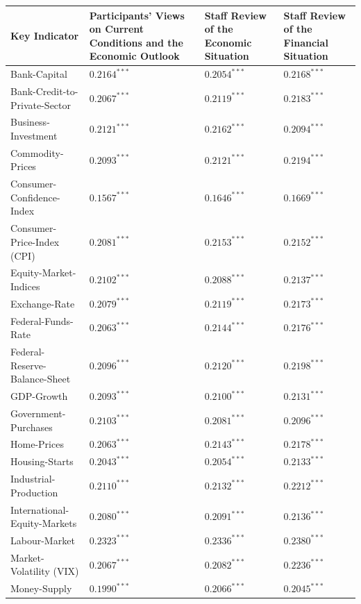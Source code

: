 \begin{table}[htbp]
\centering
\scriptsize
\begin{threeparttable}
\begin{tabular}{p{3.6cm} p{4.3cm} p{3.1cm} p{3.1cm}}
\toprule
\textbf{Key Indicator} &
\textbf{Participants’ Views on Current Conditions and the Economic Outlook} &
\textbf{Staff Review of the Economic Situation} &
\textbf{Staff Review of the Financial Situation} \\
\midrule
Bank-Capital & $0.2164^{***}$ & $0.2054^{***}$ & $0.2168^{***}$ \\
Bank-Credit-to-Private-Sector & $0.2067^{***}$ & $0.2119^{***}$ & $0.2183^{***}$ \\
Business-Investment & $0.2121^{***}$ & $0.2162^{***}$ & $0.2094^{***}$ \\
Commodity-Prices & $0.2093^{***}$ & $0.2121^{***}$ & $0.2194^{***}$ \\
Consumer-Confidence-Index & $0.1567^{***}$ & $0.1646^{***}$ & $0.1669^{***}$ \\
Consumer-Price-Index (CPI) & $0.2081^{***}$ & $0.2153^{***}$ & $0.2152^{***}$ \\
Equity-Market-Indices & $0.2102^{***}$ & $0.2088^{***}$ & $0.2137^{***}$ \\
Exchange-Rate & $0.2079^{***}$ & $0.2119^{***}$ & $0.2173^{***}$ \\
Federal-Funds-Rate & $0.2063^{***}$ & $0.2144^{***}$ & $0.2176^{***}$ \\
Federal-Reserve-Balance-Sheet & $0.2096^{***}$ & $0.2120^{***}$ & $0.2198^{***}$ \\
GDP-Growth & $0.2093^{***}$ & $0.2100^{***}$ & $0.2131^{***}$ \\
Government-Purchases & $0.2103^{***}$ & $0.2081^{***}$ & $0.2096^{***}$ \\
Home-Prices & $0.2063^{***}$ & $0.2143^{***}$ & $0.2178^{***}$ \\
Housing-Starts & $0.2043^{***}$ & $0.2054^{***}$ & $0.2133^{***}$ \\
Industrial-Production & $0.2110^{***}$ & $0.2132^{***}$ & $0.2212^{***}$ \\
International-Equity-Markets & $0.2080^{***}$ & $0.2091^{***}$ & $0.2136^{***}$ \\
Labour-Market & $0.2323^{***}$ & $0.2336^{***}$ & $0.2380^{***}$ \\
Market-Volatility (VIX) & $0.2067^{***}$ & $0.2082^{***}$ & $0.2236^{***}$ \\
Money-Supply & $0.1990^{***}$ & $0.2066^{***}$ & $0.2045^{***}$ \\

\end{tabular}
\end{threeparttable}
\end{table}
